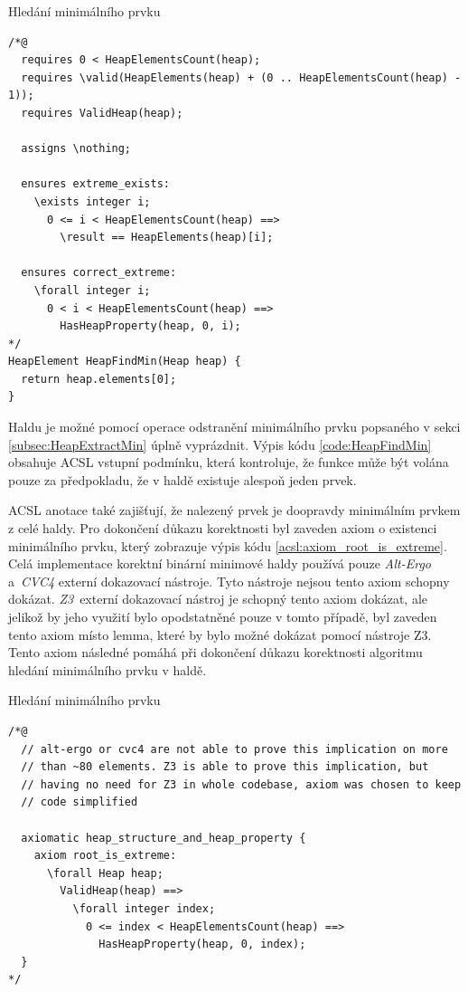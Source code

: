 \begin{listing}[H]
	\caption{Hledání minimálního prvku}
	\label{code:HeapFindMin}
	\begin{verbatim}
/*@
  requires 0 < HeapElementsCount(heap);
  requires \valid(HeapElements(heap) + (0 .. HeapElementsCount(heap) - 1));
  requires ValidHeap(heap);

  assigns \nothing;

  ensures extreme_exists:
    \exists integer i;
      0 <= i < HeapElementsCount(heap) ==>
        \result == HeapElements(heap)[i];

  ensures correct_extreme:
    \forall integer i;
      0 < i < HeapElementsCount(heap) ==>
        HasHeapProperty(heap, 0, i);
*/
HeapElement HeapFindMin(Heap heap) {
  return heap.elements[0];
}
	\end{verbatim}
\end{listing}

Haldu je možné pomocí operace odstranění minimálního prvku popsaného v sekci \ref{subsec:HeapExtractMin} úplně vyprázdnit. Výpis kódu \ref{code:HeapFindMin} obsahuje ACSL vstupní podmínku, která kontroluje, že funkce může být volána pouze za předpokladu, že v haldě existuje alespoň jeden prvek.

ACSL anotace také zajišťují, že nalezený prvek je doopravdy minimálním prvkem z celé haldy. Pro dokončení důkazu korektnosti byl zaveden axiom o existenci minimálního prvku, který zobrazuje výpis kódu \ref{acsl:axiom_root_is_extreme}. Celá implementace korektní binární minimové haldy používá pouze \mbox{\textit{Alt-Ergo}} a~\textit{CVC4} externí dokazovací nástroje. Tyto nástroje nejsou tento axiom schopny dokázat. \textit{Z3}~externí dokazovací nástroj je schopný tento axiom dokázat, ale jelikož by jeho využití bylo opodstatněné pouze v tomto případě, byl zaveden tento axiom místo lemma, které by bylo možné dokázat pomocí nástroje Z3. Tento axiom následné pomáhá při dokončení důkazu korektnosti algoritmu hledání minimálního prvku v haldě.

\begin{listing}[H]
	\caption{Hledání minimálního prvku}
	\label{acsl:axiom_root_is_extreme}
	\begin{verbatim}
/*@
  // alt-ergo or cvc4 are not able to prove this implication on more
  // than ~80 elements. Z3 is able to prove this implication, but
  // having no need for Z3 in whole codebase, axiom was chosen to keep
  // code simplified

  axiomatic heap_structure_and_heap_property {
    axiom root_is_extreme:
      \forall Heap heap;
        ValidHeap(heap) ==>
          \forall integer index;
            0 <= index < HeapElementsCount(heap) ==>
              HasHeapProperty(heap, 0, index);
  }
*/
	\end{verbatim}
\end{listing}

